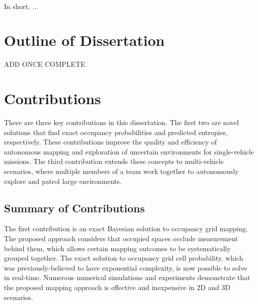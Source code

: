 \documentclass[thesis]{thesis-gwu}
\begin{document}
\

In short, ...

\section{Outline of Dissertation}

ADD ONCE COMPLETE

\section{Contributions}

There are three key contributions in this dissertation. The first two are novel solutions that find exact occupancy probabilities and predicted entropies, respectively. These contributions improve the quality and efficiency of autonomous mapping and exploration of uncertain environments for single-vehicle missions. The third contribution extends these concepts to multi-vehicle scenarios, where multiple members of a team work together to autonomously explore and patrol large environments.




\subsection{Summary of Contributions}

The first contribution is an exact Bayesian solution to occupancy grid mapping. The proposed approach considers that occupied spaces occlude measurement behind them, which allows certain mapping outcomes to be systematically grouped together. The exact solution to occupancy grid cell probability, which was previously-believed to have exponential complexity, is now possible to solve in real-time. Numerous numerical simulations and experiments demonstrate that the proposed mapping approach is effective and inexpensive in 2D and 3D scenarios.

\end{document}
